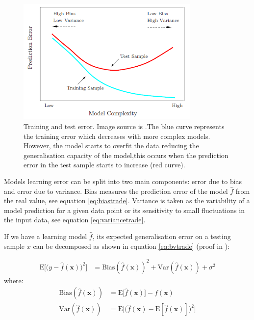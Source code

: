 \begin{figure}[!h]
  \centering
  \includegraphics[width=0.8\textwidth]{img/model_complexity}
  \caption[Training and test error]{Training and test error. Image source is
\cite{friedman2001elements}.The blue curve represents the training error which
decreases with more complex models. However, the model starts to overfit the
data reducing the generalisation capacity of the model,this occurs when the
prediction error in the test sample starts to increase (red curve).}
  \label{fig:traintesterror}
\end{figure}

Models learning error can be split into two main components: error due to bias
and error due to variance. Bias measures the prediction error of the model
$\hat{f}$ from the real value, see equation \ref{eq:biastrade}. Variance is
taken as the variability of a model prediction for a given data point or its
sensitivity to small fluctuations in the input data, see equation
\ref{eq:variancetrade}.

If we have a learning model $\hat{f}$, its expected generalisation error on a
testing sample $x$ can be decomposed as shown in equation \ref{eq:bvtrade} (proof
in \cite{geman1992neural}):

\begin{align}
\label{eq:bvtrade}
\mathrm{E}\Big[\big(y - \hat{f}(\mathbf{x})\big)^2\Big]
 & = \mathrm{Bias}(\hat{f}(\mathbf{x}))^2 + \mathrm{Var}(\hat{f}(\mathbf{x})) + \sigma^2
\end{align}
\noindent where:
\begin{align}
 \mathrm{Bias}(\hat{f}(\mathbf{x})) &= \mathrm{E}\big[\hat{f}(\mathbf{x})\big] - f(\mathbf{x}) \label{eq:biastrade}\\
 \mathrm{Var}(\hat{f}(\mathbf{x})) &= \mathrm{E}\Big[ \big( \hat{f}(\mathbf{x}) - \mathrm{E}[\hat{f}(\mathbf{x})] \big)^2 \Big]  \label{eq:variancetrade}
\end{align}


